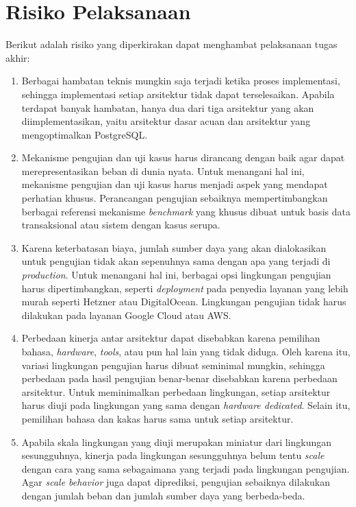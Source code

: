 \section{Risiko Pelaksanaan}

Berikut adalah risiko yang diperkirakan dapat menghambat pelaksanaan tugas akhir:

\begin{enumerate}
    \item Berbagai hambatan teknis mungkin saja terjadi ketika proses implementasi, sehingga implementasi setiap arsitektur tidak dapat terselesaikan. Apabila terdapat banyak hambatan, hanya dua dari tiga arsitektur yang akan diimplementasikan, yaitu arsitektur dasar acuan dan arsitektur yang mengoptimalkan PostgreSQL.
    \item Mekanisme pengujian dan uji kasus harus dirancang dengan baik agar dapat merepresentasikan beban di dunia nyata. Untuk menangani hal ini, mekanisme pengujian dan uji kasus harus menjadi aspek yang mendapat perhatian khusus. Perancangan pengujian sebaiknya mempertimbangkan berbagai referensi mekanisme \textit{benchmark} yang khusus dibuat untuk basis data transaksional atau sistem dengan kasus serupa.
    \item Karena keterbatasan biaya, jumlah sumber daya yang akan dialokasikan untuk pengujian tidak akan sepenuhnya sama dengan apa yang terjadi di \textit{production}. Untuk menangani hal ini, berbagai opsi lingkungan pengujian harus dipertimbangkan, seperti \textit{deployment} pada penyedia layanan yang lebih murah seperti Hetzner atau DigitalOcean. Lingkungan pengujian tidak harus dilakukan pada layanan Google Cloud atau AWS.
    \item Perbedaan kinerja antar arsitektur dapat disebabkan karena pemilihan bahasa, \textit{hardware}, \textit{tools}, atau pun hal lain yang tidak diduga. Oleh karena itu, variasi lingkungan pengujian harus dibuat seminimal mungkin, sehingga perbedaan pada hasil pengujian benar-benar disebabkan karena perbedaan arsitektur. Untuk meminimalkan perbedaan lingkungan, setiap arsitektur harus diuji pada lingkungan yang sama dengan \textit{hardware dedicated}. Selain itu, pemilihan bahasa dan kakas harus sama untuk setiap arsitektur.
    \item Apabila skala lingkungan yang diuji merupakan miniatur dari lingkungan sesungguhnya, kinerja pada lingkungan sesungguhnya belum tentu \textit{scale} dengan cara yang sama sebagaimana yang terjadi pada lingkungan pengujian. Agar \textit{scale behavior} juga dapat diprediksi, pengujian sebaiknya dilakukan dengan jumlah beban dan jumlah sumber daya yang berbeda-beda.
\end{enumerate}